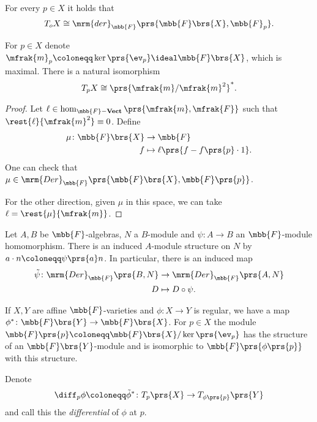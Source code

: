 \documentclass[10pt,a4paper,twoside,openany,hidelinks]{book}
\begin{document}
\begin{corollary}
For every $p \in X$ it holds that
\begin{align*}
T_o X \cong \mrm{der}_{\mbb{F}}\prs{\mbb{F}\brs{X}, \mbb{F}_p} \text{.}
\end{align*}
\end{corollary}

\begin{proposition}
For $p \in X$ denote $\mfrak{m}_p \coloneqq \ker\prs{\ev_p} \ideal \mbb{F}\brs{X}$, which is maximal.
There is a natural isomorphism
\[T_p X \cong \prs{\mfrak{m}/\mfrak{m}^2}^* \text{.}\]
\end{proposition}


\begin{proof}
Let $\ell \in \hom_{\mbb{F}\mathbf{-Vect}}\prs{\mfrak{m}, \mfrak{F}}$ such that $\rest{\ell}{\mfrak{m}^2} \equiv 0$.
Define
\begin{align*}
\mu \colon \mbb{F}\brs{X} &\to \mbb{F} \\
f &\mapsto \ell\prs{f-f\prs{p}\cdot 1} \text{.}
\end{align*}
One can check that $\mu \in \mrm{Der}_{\mbb{F}}\prs{\mbb{F}\brs{X}, \mbb{F}\prs{p}}$.

For the other direction, given $\mu$ in this space, we can take $\ell = \rest{\mu}{\mfrak{m}}$.
\end{proof}

Let $A,B$ be $\mbb{F}$-algebras, $N$ a $B$-module and $\psi \colon A \to B$ an $\mbb{F}$-module homomorphism.
There is an induced $A$-module structure on $N$ by $a \cdot n \coloneqq \psi\prs{a} n$.
In particular, there is an induced map
\begin{align*}
\tilde{\psi} \colon \mrm{Der}_{\mbb{F}}\prs{B,N} &\to \mrm{Der}_{\mbb{F}}\prs{A,N} \\
D &\mapsto D \circ \psi \text{.}
\end{align*}

If $X,Y$ are affine $\mbb{F}$-varieties and $\phi \colon X \to Y$ is regular, we have a map $\phi^* \colon \mbb{F}\brs{Y} \to \mbb{F}\brs{X}$.
For $p \in X$ the module $\mbb{F}\prs{p} \coloneqq \mbb{F}\brs{X}/\ker\prs{\ev_p}$ has the structure of an $\mbb{F}\brs{Y}$-module and is isomorphic to $\mbb{F}\prs{\phi\prs{p}}$ with this structure.

\begin{definition}
Denote
\begin{align*}
\diff_p \phi \coloneqq \tilde{\phi}^* \colon T_p\prs{X} \to T_{\phi\prs{p}}\prs{Y}
\end{align*}
and call this the \emph{differential} of $\phi$ at $p$.
\end{definition}
\end{document}
